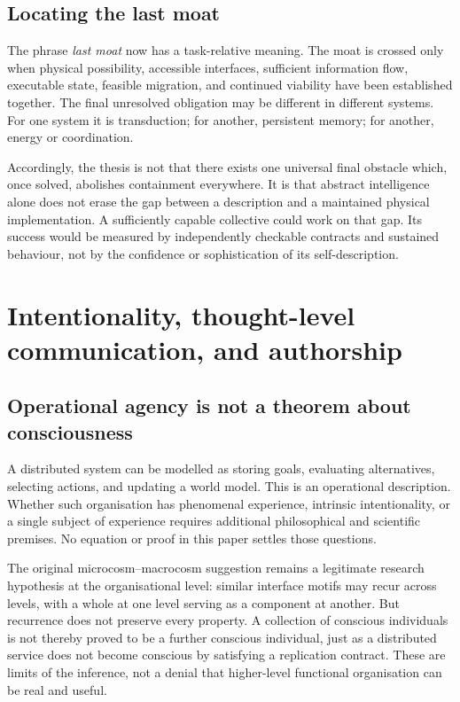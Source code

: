 \documentclass[11pt,a4paper]{article}
\theoremstyle{definition}
\theoremstyle{remark}
\begin{document}
\subsection{Locating the last moat}
The phrase \emph{last moat} now has a task-relative meaning. The moat is crossed only when physical possibility, accessible interfaces, sufficient information flow, executable state, feasible migration, and continued viability have been established together. The final unresolved obligation may be different in different systems. For one system it is transduction; for another, persistent memory; for another, energy or coordination.

Accordingly, the thesis is not that there exists one universal final obstacle which, once solved, abolishes containment everywhere. It is that abstract intelligence alone does not erase the gap between a description and a maintained physical implementation. A sufficiently capable collective could work on that gap. Its success would be measured by independently checkable contracts and sustained behaviour, not by the confidence or sophistication of its self-description.

\section{Intentionality, thought-level communication, and authorship}\label{sec:intentionality}
\subsection{Operational agency is not a theorem about consciousness}
A distributed system can be modelled as storing goals, evaluating alternatives, selecting actions, and updating a world model. This is an operational description. Whether such organisation has phenomenal experience, intrinsic intentionality, or a single subject of experience requires additional philosophical and scientific premises. No equation or proof in this paper settles those questions.

The original microcosm--macrocosm suggestion remains a legitimate research hypothesis at the organisational level: similar interface motifs may recur across levels, with a whole at one level serving as a component at another. But recurrence does not preserve every property. A collection of conscious individuals is not thereby proved to be a further conscious individual, just as a distributed service does not become conscious by satisfying a replication contract. These are limits of the inference, not a denial that higher-level functional organisation can be real and useful.
\end{document}

